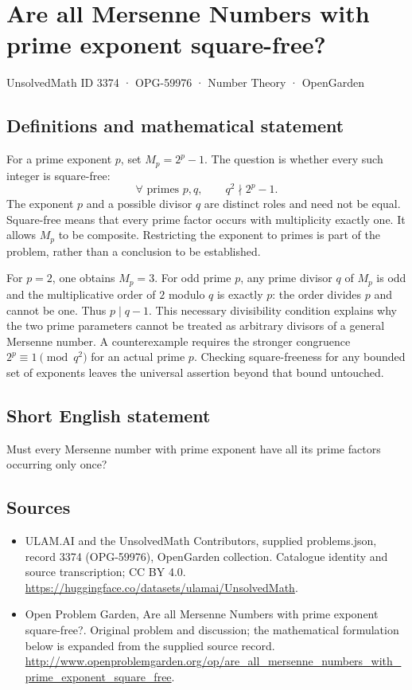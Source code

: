\documentclass[11pt,a4paper]{article}
\begin{document}
\section*{Are all Mersenne Numbers with prime exponent square-free?}\label{3374}
{\small UnsolvedMath ID 3374 · OPG-59976 · Number Theory · OpenGarden}
\subsection{Definitions and mathematical statement}
For a prime exponent $p$, set $M_p=2^p-1$. The question is whether
every such integer is square-free:
\[
 \forall\text{ primes }p,q,\qquad q^2\nmid 2^p-1.
\]
The exponent $p$ and a possible divisor $q$ are distinct roles and
need not be equal. Square-free means that every prime factor occurs
with multiplicity exactly one. It allows $M_p$ to be composite.
Restricting the exponent to primes is part of the problem, rather
than a conclusion to be established.

For $p=2$, one obtains $M_p=3$. For odd prime $p$, any prime divisor
$q$ of $M_p$ is odd and the multiplicative order of $2$ modulo $q$
is exactly $p$: the order divides $p$ and cannot be one. Thus
$p\mid q-1$. This necessary divisibility condition explains why the
two prime parameters cannot be treated as arbitrary divisors of a
general Mersenne number. A counterexample requires the stronger
congruence $2^p\equiv1\pmod{q^2}$ for an actual prime $p$.
Checking square-freeness for any bounded set of exponents leaves the
universal assertion beyond that bound untouched.
\subsection{Short English statement}
Must every Mersenne number with prime exponent have all its prime factors occurring only once?
\subsection{Sources}
\begin{itemize}
\item[S1] ULAM.AI and the UnsolvedMath Contributors, supplied problems.json, record 3374 (OPG-59976), OpenGarden collection. Catalogue identity and source transcription; CC BY 4.0.
\url{https://huggingface.co/datasets/ulamai/UnsolvedMath}.
\item[S2] Open Problem Garden, Are all Mersenne Numbers with prime exponent square-free?. Original problem and discussion; the mathematical formulation below is expanded from the supplied source record.
\url{http://www.openproblemgarden.org/op/are_all_mersenne_numbers_with_prime_exponent_square_free}.
\end{itemize}
\end{document}
